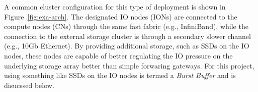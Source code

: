 \documentclass[conference]{IEEEtran}
\begin{document}
A common cluster configuration for this type of deployment is shown in
Figure~\ref{fig:exa-arch}. The designated IO nodes (IONs) are connected to the
compute nodes (CNs) through the same fast fabric (e.g., InfiniBand), while the
connection to the external storage cluster is through a secondary slower
channel (e.g., 10Gb Ethernet). By providing additional storage, such as SSDs on
the IO nodes, these nodes are capable of better regulating the IO pressure on
the underlying storage array better than simple forwaring gateways. For this
project, using something like SSDs on the IO nodes is termed a {\em Burst
Buffer} and is disucssed below.

%
%

\end{document}
